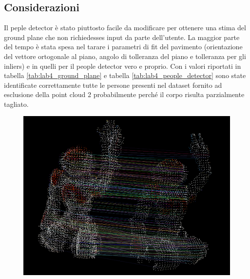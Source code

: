 \documentclass[a4paper]{article}
\begin{document}
	\subsection{Considerazioni} \label{sec:lab4_disc}
	Il peple detector è stato piuttosto facile da modificare per ottenere una stima del ground plane che non richiedesses input da parte dell'utente. La maggior parte del tempo è stata spesa nel tarare i parametri di fit del pavimento (orientazione del vettore ortogonale al piano, angolo di tolleranza del piano e tolleranza per gli inliers) e in quelli per il people detector vero e proprio. Con i valori riportati in tabella \ref{tab:lab4_ground_plane} e tabella \ref{tab:lab4_people_detector} sono state identificate correttamente tutte le persone presenti nel dataset fornito ad esclusione della point cloud 2 probabilmente perché il corpo risulta parzialmente tagliato. \\
	
	\begin{figure}
		\centering
		\includegraphics[width=1\textwidth]{images/lab4_nao_correspondences.png}
		\caption{\label{fig:lab4_nao_correspondences}}
	\end{figure}
	
\end{document}
